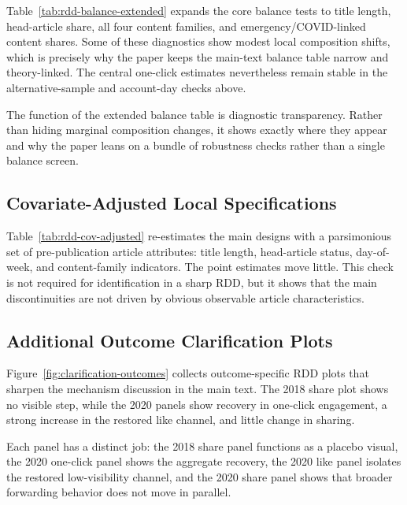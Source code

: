 \documentclass[12pt, american]{article}
\begin{document}
Table~\ref{tab:rdd-balance-extended} expands the core balance tests to title length, head-article share, all four content families, and emergency/COVID-linked content shares. Some of these diagnostics show modest local composition shifts, which is precisely why the paper keeps the main-text balance table narrow and theory-linked. The central one-click estimates nevertheless remain stable in the alternative-sample and account-day checks above.

The function of the extended balance table is diagnostic transparency. Rather than hiding marginal composition changes, it shows exactly where they appear and why the paper leans on a bundle of robustness checks rather than a single balance screen.



\subsection{Covariate-Adjusted Local Specifications}

Table~\ref{tab:rdd-cov-adjusted} re-estimates the main designs with a parsimonious set of pre-publication article attributes: title length, head-article status, day-of-week, and content-family indicators. The point estimates move little. This check is not required for identification in a sharp RDD, but it shows that the main discontinuities are not driven by obvious observable article characteristics.



\subsection{Additional Outcome Clarification Plots}

Figure~\ref{fig:clarification-outcomes} collects outcome-specific RDD plots that sharpen the mechanism discussion in the main text. The 2018 share plot shows no visible step, while the 2020 panels show recovery in one-click engagement, a strong increase in the restored like channel, and little change in sharing.

Each panel has a distinct job: the 2018 share panel functions as a placebo visual, the 2020 one-click panel shows the aggregate recovery, the 2020 like panel isolates the restored low-visibility channel, and the 2020 share panel shows that broader forwarding behavior does not move in parallel.
\end{document}
